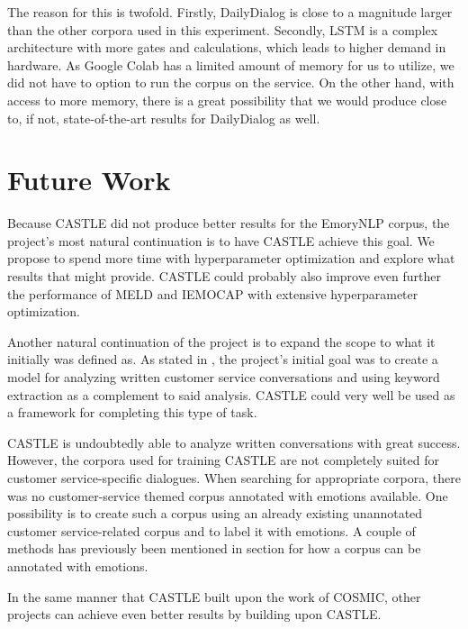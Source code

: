 \documentclass[nofilelist]{cslthse-msc}
\begin{document}
The reason for this is twofold. Firstly, DailyDialog is close to a magnitude larger than the other corpora used in this experiment. Secondly, LSTM is a complex architecture with more gates and calculations, which leads to higher demand in hardware. As Google Colab has a limited amount of memory for us to utilize, we did not have to option to run the corpus on the service. On the other hand, with access to more memory, there is a great possibility that we would produce close to, if not, state-of-the-art results for DailyDialog as well.

\section{Future Work}

\label{futurework}

Because CASTLE did not produce better results for the EmoryNLP corpus, the project's most natural continuation is to have CASTLE achieve this goal. We propose to spend more time with hyperparameter optimization and explore what results that might provide. CASTLE could probably also improve even further the performance of MELD and IEMOCAP with extensive hyperparameter optimization.  


Another natural continuation of the project is to expand the scope to what it initially was defined as. As stated in , the project's initial goal was to create a model for analyzing written customer service conversations and using keyword extraction as a complement to said analysis. CASTLE could very well be used as a framework for completing this type of task.


CASTLE is undoubtedly able to analyze written conversations with great success. However, the corpora used for training CASTLE are not completely suited for customer service-specific dialogues. When searching for appropriate corpora, there was no customer-service themed corpus annotated with emotions available. One possibility is to create such a corpus using an already existing unannotated customer service-related corpus and to label it with emotions. A couple of methods has previously been mentioned in section  for how a corpus can be annotated with emotions. 


In the same manner that CASTLE built upon the work of COSMIC, other projects can achieve even better results by building upon CASTLE. 
\end{document}
